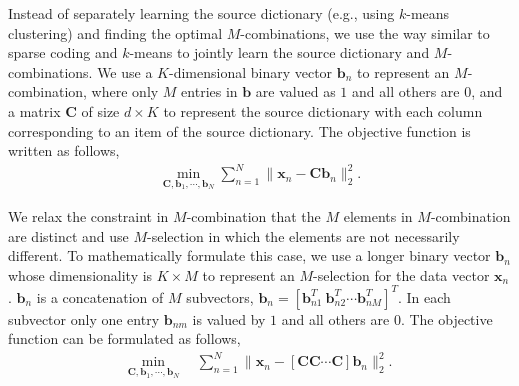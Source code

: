 \documentclass[10pt, letterpaper]{article}
\begin{document}
Instead of separately learning the source dictionary
(e.g., using $k$-means clustering)
and finding the optimal $M$-combinations,
we use the way similar to sparse coding and $k$-means
to jointly learn the source dictionary and $M$-combinations.
We use a $K$-dimensional binary vector $\mathbf{b}_n$
to represent an $M$-combination,
where only $M$ entries in $\mathbf{b}$ are valued as $1$
and all others are $0$,
and a matrix $\mathbf{C}$
of size $d \times K$
to represent the source dictionary
with each column corresponding to an item
of the source dictionary.
The objective function is written as follows,
\begin{align}
\min_{\mathbf{C}, \mathbf{b}_1, \cdots, \mathbf{b}_N} \sum\nolimits_{n=1}^N \|\mathbf{x}_n - \mathbf{C}\mathbf{b}_n\|_2^2.\label{eqn:compositecoding}
\end{align}

We relax the constraint in $M$-combination
that the $M$ elements in $M$-combination are distinct
and use $M$-selection in which the elements are not necessarily different.
To mathematically formulate this case,
we use a longer binary vector $\mathbf{b}_n$
whose dimensionality is $K\times M$
to represent an $M$-selection
for the data vector $\mathbf{x}_n$.
$\mathbf{b}_n$ is a concatenation
of $M$ subvectors,
$\mathbf{b}_n = \left[\mathbf{b}_{n1}^T~\mathbf{b}_{n2}^T\cdots\mathbf{b}_{nM}^T\right]^T$.
In each subvector
only one entry $\mathbf{b}_{nm}$ is valued by $1$
and all others are $0$.
The objective function can be formulated as follows,
\begin{align}
\min_{\mathbf{C}, \mathbf{b}_1, \cdots, \mathbf{b}_N}~& ~\sum\nolimits_{n=1}^N \|\mathbf{x}_n - \left[\mathbf{C} \mathbf{C} \cdots \mathbf{C}\right]\mathbf{b}_n\|_2^2. \label{eqn:homogeneouscompositecoding}
\end{align}

\end{document}
